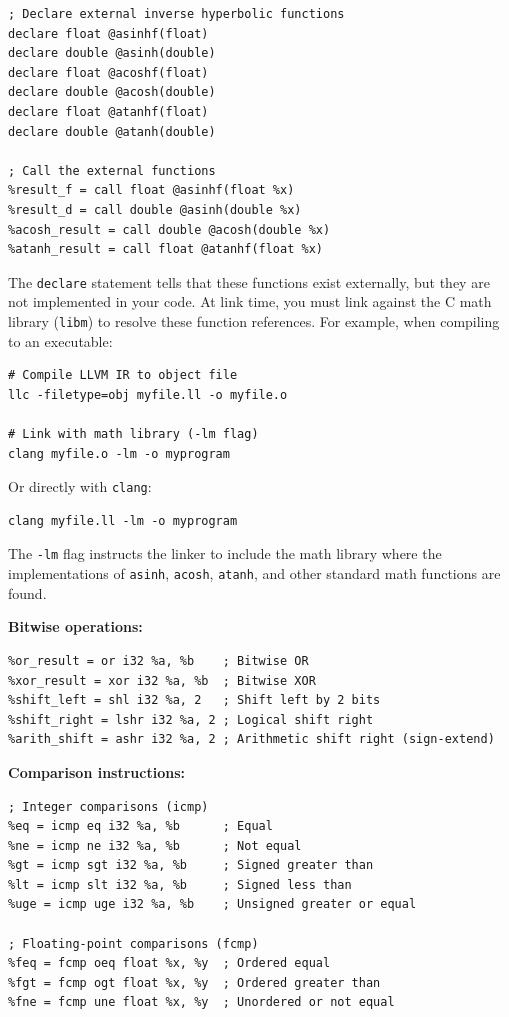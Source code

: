 \begin{lstlisting}[style=ir]
; Declare external inverse hyperbolic functions
declare float @asinhf(float)
declare double @asinh(double)
declare float @acoshf(float)
declare double @acosh(double)
declare float @atanhf(float)
declare double @atanh(double)

; Call the external functions
%result_f = call float @asinhf(float %x)
%result_d = call double @asinh(double %x)
%acosh_result = call double @acosh(double %x)
%atanh_result = call float @atanhf(float %x)
\end{lstlisting}

The \texttt{declare} statement tells  that these functions exist externally, but they are not implemented in your  code. At link time, you must link against the C math library (\texttt{libm}) to resolve these function references. For example, when compiling to an executable:

\begin{lstlisting}[style=ir]
# Compile LLVM IR to object file
llc -filetype=obj myfile.ll -o myfile.o

# Link with math library (-lm flag)
clang myfile.o -lm -o myprogram
\end{lstlisting}

Or directly with \texttt{clang}:

\begin{lstlisting}[style=ir]
clang myfile.ll -lm -o myprogram
\end{lstlisting}

The \texttt{-lm} flag instructs the linker to include the math library where the implementations of \texttt{asinh}, \texttt{acosh}, \texttt{atanh}, and other standard math functions are found.

\textbf{Bitwise operations:}

\begin{lstlisting}[style=ir]
%and_result = and i32 %a, %b  ; Bitwise AND
%or_result = or i32 %a, %b    ; Bitwise OR
%xor_result = xor i32 %a, %b  ; Bitwise XOR
%shift_left = shl i32 %a, 2   ; Shift left by 2 bits
%shift_right = lshr i32 %a, 2 ; Logical shift right
%arith_shift = ashr i32 %a, 2 ; Arithmetic shift right (sign-extend)
\end{lstlisting}

\textbf{Comparison instructions:}

\begin{lstlisting}[style=ir]
; Integer comparisons (icmp)
%eq = icmp eq i32 %a, %b      ; Equal
%ne = icmp ne i32 %a, %b      ; Not equal
%gt = icmp sgt i32 %a, %b     ; Signed greater than
%lt = icmp slt i32 %a, %b     ; Signed less than
%uge = icmp uge i32 %a, %b    ; Unsigned greater or equal

; Floating-point comparisons (fcmp)
%feq = fcmp oeq float %x, %y  ; Ordered equal
%fgt = fcmp ogt float %x, %y  ; Ordered greater than
%fne = fcmp une float %x, %y  ; Unordered or not equal
\end{lstlisting}

